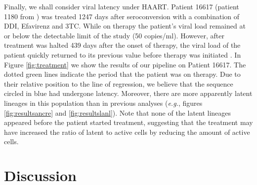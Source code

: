 \documentclass[12pt]{article}
\begin{document}

Finally, we shall consider viral latency under HAART.
Patient 16617 (patient 1180 from \cite{Llewellyn06}) was treated 1247 days after seroconversion with a combination of DDI, Efavirenz and 3TC.
While on therapy the patient's viral load remained at or below the detectable limit of the study (50 copies/ml).
However, after treatment was halted 439 days after the onset of therapy, the viral load of the patient quickly returned to its previous value before therapy was initiated \cite{Llewellyn06}.
In Figure \ref{fig:treatment} we show the results of our pipeline on Patient 16617.
The dotted green lines indicate the period that the patient was on therapy.
Due to their relative position to the line of regression, we believe that the sequence circled in blue had undergone latency.
Moreover, there are more apparently latent lineages in this population than in previous analyses (\textit{e.g.}, figures \ref{fig:resultsancre} and \ref{fig:resultslanl}).
Note that none of the latent lineages appeared before the patient started treatment, suggesting that the treatment may have increased the ratio of latent to active cells by reducing the amount of active cells.

\section * {Discussion} \label{sec:discuss}
\end{document}
